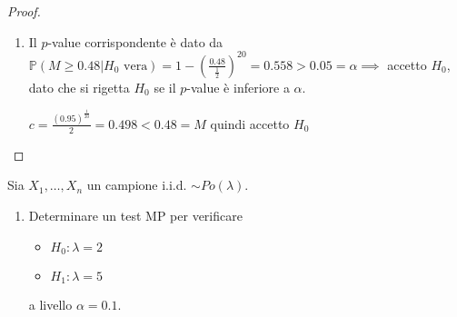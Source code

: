 \documentclass[hidelinks, 10pt]{report}
\begin{document}
\begin{proof}
\begin{enumerate}
\begin{enumerate}
\item Il $ p $-value corrispondente \`e dato da $ \mathbb{P} (M \ge 0.48 \vert H_{0} \text{ vera}) = 1 - \left( \frac{0.48}{\frac{1}{2}} \right)^{20} = 0.558 > 0.05 = \alpha \implies $ accetto $ H_{0} $, dato che si rigetta $ H_{0} $ se il $ p $-value \`e inferiore a $ \alpha $.


$ c = \frac{(0.95)^{\frac{1}{20}}}{2} = 0.498 < 0.48 = M $ quindi accetto $ H_{0} $
\end{enumerate}
\end{enumerate}
\end{proof}

\begin{ex}
Sia $ X_{1}, \dotsc, X_{n} $ un campione i.i.d. $ \sim Po(\lambda) $.
\begin{enumerate}
\item Determinare un test MP per verificare
\begin{itemize}
\item $ H_{0} : \lambda = 2 $
\item $ H_{1} : \lambda = 5 $
\end{itemize}
a livello $ \alpha = 0.1 $.
\end{enumerate}
\end{ex}
\end{document}
